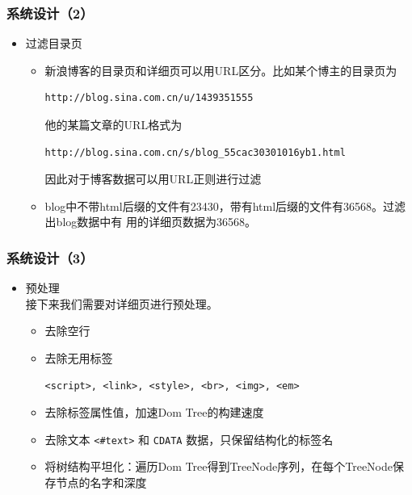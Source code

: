 \documentclass[11pt,presentation]{beamer}
\begin{document}
\begin{frame}[fragile]
\frametitle{系统设计（2）}
\label{sec-2-4}
\begin{itemize}

\item 过滤目录页
\label{sec-2-4-1}%
\begin{itemize}
\item 新浪博客的目录页和详细页可以用URL区分。比如某个博主的目录页为
  \tiny

\begin{verbatim}
http://blog.sina.com.cn/u/1439351555
\end{verbatim}
  \normalsize
  他的某篇文章的URL格式为
  \tiny

\begin{verbatim}
http://blog.sina.com.cn/s/blog_55cac30301016yb1.html
\end{verbatim}
  \normalsize
  因此对于博客数据可以用URL正则进行过滤
\item blog中不带html后缀的文件有23430，带有html后缀的文件有36568。过滤出blog数据中有
  用的详细页数据为36568。
\end{itemize}

\end{itemize} %
\end{frame}
\begin{frame}[fragile]
\frametitle{系统设计（3）}
\label{sec-2-5}
\begin{itemize}

\item 预处理\\
\label{sec-2-5-1}%
接下来我们需要对详细页进行预处理。
\begin{itemize}
\item 去除空行
\item 去除无用标签

\begin{verbatim}
<script>, <link>, <style>, <br>, <img>, <em>
\end{verbatim}
\item 去除标签属性值，加速Dom Tree的构建速度
\item 去除文本 \texttt{<\#text>} 和 \texttt{CDATA} 数据，只保留结构化的标签名
\item 将树结构平坦化：遍历Dom Tree得到TreeNode序列，在每个TreeNode保存节点的名字和深度
\end{itemize}
\end{itemize} %
\end{frame}
\end{document}
